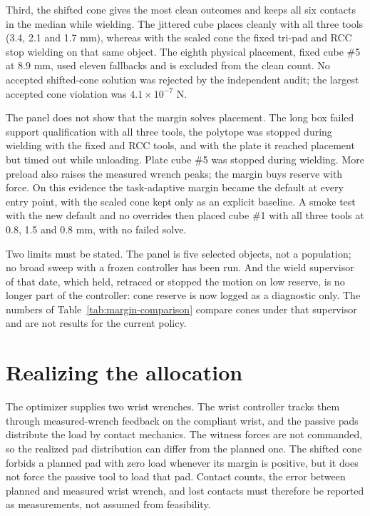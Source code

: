 Third, the shifted cone gives the most clean outcomes and keeps all six contacts in the median while wielding. The jittered cube places cleanly with all three tools (3.4, 2.1 and 1.7 mm), whereas with the scaled cone the fixed tri-pad and RCC stop wielding on that same object. The eighth physical placement, fixed cube \#5 at $8.9$ mm, used eleven fallbacks and is excluded from the clean count. No accepted shifted-cone solution was rejected by the independent audit; the largest accepted cone violation was $4.1\times10^{-7}$ N.

The panel does not show that the margin solves placement. The long box failed support qualification with all three tools, the polytope was stopped during wielding with the fixed and RCC tools, and with the plate it reached placement but timed out while unloading. Plate cube \#5 was stopped during wielding. More preload also raises the measured wrench peaks; the margin buys reserve with force. On this evidence the task-adaptive margin became the default at every entry point, with the scaled cone kept only as an explicit baseline. A smoke test with the new default and no overrides then placed cube \#1 with all three tools at 0.8, 1.5 and 0.8 mm, with no failed solve.

Two limits must be stated. The panel is five selected objects, not a population; no broad sweep with a frozen controller has been run. And the wield supervisor of that date, which held, retraced or stopped the motion on low reserve, is no longer part of the controller: cone reserve is now logged as a diagnostic only. The numbers of Table~\ref{tab:margin-comparison} compare cones under that supervisor and are not results for the current policy.

\section{Realizing the allocation}

The optimizer supplies two wrist wrenches. The wrist controller tracks them through measured-wrench feedback on the compliant wrist, and the passive pads distribute the load by contact mechanics. The witness forces are not commanded, so the realized pad distribution can differ from the planned one. The shifted cone forbids a planned pad with zero load whenever its margin is positive, but it does not force the passive tool to load that pad. Contact counts, the error between planned and measured wrist wrench, and lost contacts must therefore be reported as measurements, not assumed from feasibility.

